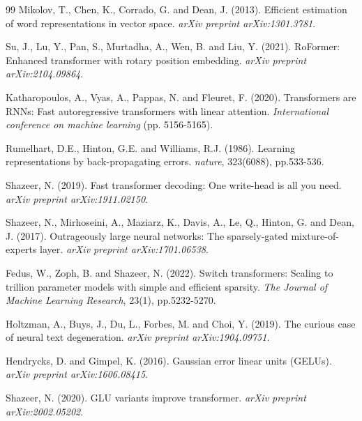 \documentclass[11pt]{article}
\begin{document}
\begin{thebibliography}{99}
		Mikolov, T., Chen, K., Corrado, G. and Dean, J. (2013).
		Efficient estimation of word representations in vector space.
		\textit{arXiv preprint arXiv:1301.3781}.
		
		Su, J., Lu, Y., Pan, S., Murtadha, A., Wen, B. and Liu, Y. (2021).
		RoFormer: Enhanced transformer with rotary position embedding.
		\textit{arXiv preprint arXiv:2104.09864}.
		
		Katharopoulos, A., Vyas, A., Pappas, N. and Fleuret, F. (2020).
		Transformers are RNNs: Fast autoregressive transformers with linear attention.
		\textit{International conference on machine learning} (pp. 5156-5165).
		
		Rumelhart, D.E., Hinton, G.E. and Williams, R.J. (1986).
		Learning representations by back-propagating errors.
		\textit{nature}, 323(6088), pp.533-536.
		
		Shazeer, N. (2019).
		Fast transformer decoding: One write-head is all you need.
		\textit{arXiv preprint arXiv:1911.02150}.
		
		Shazeer, N., Mirhoseini, A., Maziarz, K., Davis, A., Le, Q., Hinton, G. and Dean, J. (2017).
		Outrageously large neural networks: The sparsely-gated mixture-of-experts layer.
		\textit{arXiv preprint arXiv:1701.06538}.
		
		Fedus, W., Zoph, B. and Shazeer, N. (2022).
		Switch transformers: Scaling to trillion parameter models with simple and efficient sparsity.
		\textit{The Journal of Machine Learning Research}, 23(1), pp.5232-5270.
		
		Holtzman, A., Buys, J., Du, L., Forbes, M. and Choi, Y. (2019).
		The curious case of neural text degeneration.
		\textit{arXiv preprint arXiv:1904.09751}.
		
		Hendrycks, D. and Gimpel, K. (2016).
		Gaussian error linear units (GELUs).
		\textit{arXiv preprint arXiv:1606.08415}.
		
		Shazeer, N. (2020).
		GLU variants improve transformer.
		\textit{arXiv preprint arXiv:2002.05202}.
		
	\end{thebibliography}
	
\end{document}
